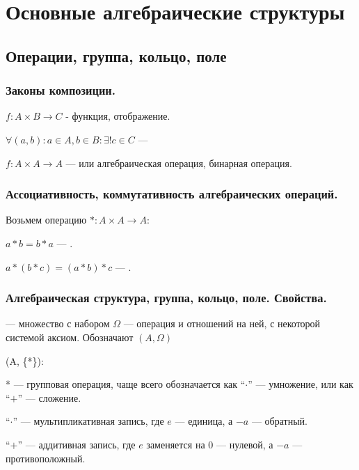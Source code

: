 \section{Основные алгебраические структуры}
\subsection{Операции, группа, кольцо, поле}
\subsubsection{Законы композиции.}

$f: A \times B \rightarrow C$ - функция, отображение.

$\forall (a,b): a \in A, b \in B: \exists! c \in C$ --- 

$f: A \times A \rightarrow A$ ---  или алгебраическая операция, бинарная операция.

\subsubsection{Ассоциативность, коммутативность алгебраических операций.}

Возьмем операцию $*: A \times A \rightarrow A$:

$a * b = b * a$ --- .

$a * (b *c) = (a * b) *c$ --- .


\subsubsection{Алгебраическая структура, группа, кольцо, поле. Свойства.}

 --- множество с набором $\Omega$ --- операция и отношений на ней, с некоторой системой аксиом. Обозначают $(A, \Omega)$

 (A, \{*\}):

* --- групповая операция, чаще всего обозначается как ``$\cdot$'' --- умножение, или как ``$+$'' --- сложение.

``$\cdot$'' --- мультипликативная запись, где $e$ --- единица, а $-a$ --- обратный.

``$+$'' --- аддитивная запись, где $e$ заменяется на $0$ --- нулевой, а $-a$ --- противоположный.

